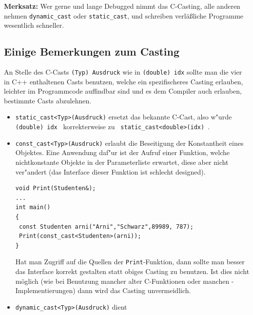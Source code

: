 \textbf{Merksatz:} Wer gerne und lange Debugged nimmt das C-Casting, alle anderen nehmen 
 \verb|dynamic_cast| oder  \verb|static_cast|, und schreiben verläßliche Programme wesentlich schneller.

%
%
\subsection{Einige Bemerkungen zum Casting}
\label{sec:A4.4}
An Stelle des C-Casts \verb|(Typ) Ausdruck| wie in \verb|(double) idx|
sollte man die vier in C++ enthaltenen Casts benutzen, welche ein spezifischeres
Casting erlauben, leichter im Programmcode auffindbar sind und es dem
Compiler auch erlauben, bestimmte Casts abzulehnen.
%
\begin{itemize}
 \item \verb|static_cast<Typ>(Ausdruck)|
 ersetzt das bekannte C-Cast, also w"urde \verb| (double) idx | korrekterweise zu
 \verb| static_cast<double>(idx) |\enspace.
%
 \item \verb|const_cast<Typ>(Ausdruck)| erlaubt die
 Beseitigung der Konstantheit eines Objektes. Eine Anwendung daf"ur ist der
 Aufruf einer Funktion, welche nichtkonstante Objekte in der
 Parameterliste erwartet, diese aber nicht ver"andert
 (das Interface dieser Funktion ist schlecht designed).
\begin{verbatim}
void Print(Studenten&);
...
int main()
{
 const Studenten arni("Arni","Schwarz",89989, 787);
 Print(const_cast<Studenten>(arni));
}
\end{verbatim}
Hat man Zugriff auf die Quellen der \verb|Print|-Funktion, dann sollte man besser das Interface 
korrekt gestalten statt obiges Casting zu benutzen. Ist dies nicht möglich 
(wie bei Benutzung mancher alter C-Funktionen oder manchen -Implementierungen) dann 
wird das Casting unvermeidlich.
%
%
%
 \item \verb|dynamic_cast<Typ>(Ausdruck)| dient

\end{itemize}
